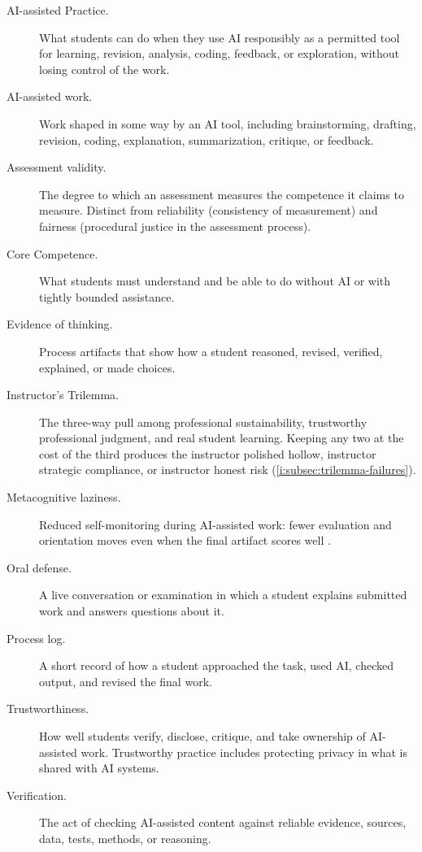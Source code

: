 \documentclass{SIAMbook2023}
\begin{document}
\begin{description}
\item[AI-assisted Practice.] What students can do when they use AI responsibly as a permitted tool for learning, revision, analysis, coding, feedback, or exploration, without losing control of the work.
\item[AI-assisted work.] Work shaped in some way by an AI tool, including brainstorming, drafting, revision, coding, explanation, summarization, critique, or feedback.
\item[Assessment validity.] The degree to which an assessment measures the competence it claims to measure. Distinct from reliability (consistency of measurement) and fairness (procedural justice in the assessment process).
\item[Core Competence.] What students must understand and be able to do without AI or with tightly bounded assistance.
\item[Evidence of thinking.] Process artifacts that show how a student reasoned, revised, verified, explained, or made choices.
\item[Instructor's Trilemma.] The three-way pull among professional sustainability, trustworthy professional judgment, and real student learning. Keeping any two at the cost of the third produces the instructor polished hollow, instructor strategic compliance, or instructor honest risk (\cref{i:subsec:trilemma-failures}).
\item[Metacognitive laziness.] Reduced self-monitoring during AI-assisted work: fewer evaluation and orientation moves even when the final artifact scores well \citep{fan2025beware}.
\item[Oral defense.] A live conversation or examination in which a student explains submitted work and answers questions about it.
\item[Process log.] A short record of how a student approached the task, used AI, checked output, and revised the final work.
\item[Trustworthiness.] How well students verify, disclose, critique, and take ownership of AI-assisted work. Trustworthy practice includes protecting privacy in what is shared with AI systems.
\item[Verification.] The act of checking AI-assisted content against reliable evidence, sources, data, tests, methods, or reasoning.
\end{description}

\end{document}
